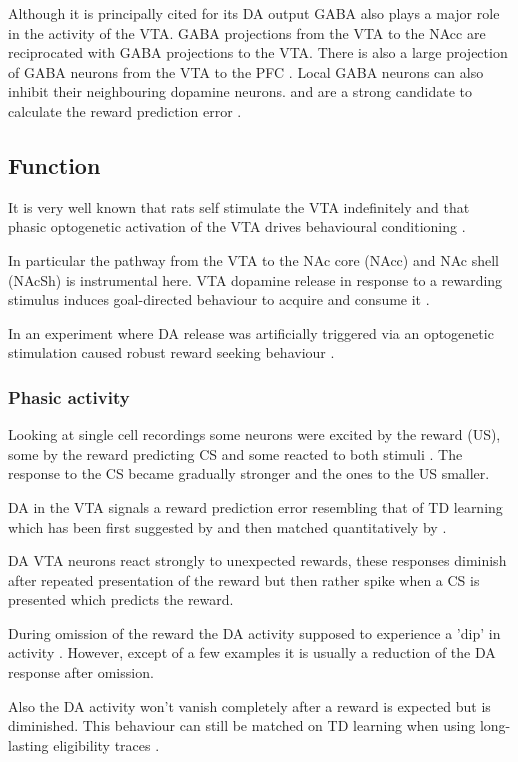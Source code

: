 \documentclass[12pt,a4paper]{article}
\begin{document}
Although it is principally cited for its DA output GABA also plays a
major role in the activity of the VTA.  GABA projections from the VTA
to the NAcc are reciprocated with GABA projections to the VTA. There
is also a large projection of GABA neurons from the VTA to the PFC
\citep{Carr2000}. Local GABA neurons can also inhibit their
neighbouring dopamine neurons.\citep{Sesack2010} and are a strong
candidate to calculate the reward prediction error \citep{Eshel2015}.


\subsection{Function}
It is very well known that rats self stimulate the VTA indefinitely
\citep{Stuber2016} and that phasic optogenetic activation of the VTA
drives behavioural conditioning \citep{Tsai2009}.

In particular the pathway from the VTA to the NAc core (NAcc) and NAc
shell (NAcSh) is instrumental here. VTA dopamine release in response
to a rewarding stimulus induces goal-directed behaviour to acquire and
consume it \citep{Morales2017}.

In an experiment where DA release was artificially triggered via an
optogenetic stimulation caused robust reward seeking behaviour
\citep{Steinberg2013}.

\subsubsection{Phasic activity}
Looking at single cell recordings some neurons were excited by the
reward (US), some by the reward predicting CS and some reacted to both
stimuli \citep{Cohen2012}. The response to the CS became gradually
stronger and the ones to the US smaller.

DA in the VTA signals a reward prediction error resembling that of TD
learning which has been first suggested by \citep{Schultz1997} and
then matched quantitatively by \citep{Bayer2005}.

DA VTA neurons react strongly to unexpected rewards, these responses
diminish after repeated presentation of the reward but then rather
spike when a CS is presented which predicts the reward.

During omission of the reward the DA activity supposed to experience a
'dip' in activity \citep{Takahashi2017}. However, except of a few
examples it is usually a reduction of the DA response after omission.

Also the DA activity won't vanish completely after a reward is
expected but is diminished. This behaviour can still be matched on TD
learning when using long-lasting eligibility traces \citep{Pan2005}.
\end{document}
